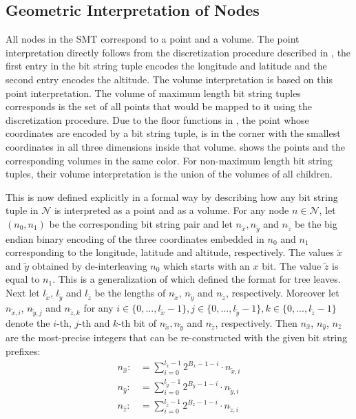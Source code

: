 \documentclass[10pt,conference,compsocconf]{IEEEtran}
\begin{document}
\subsection{Geometric Interpretation of Nodes}
\label{sec:data-structure:intermediate}
All nodes in the SMT correspond to a point and a volume.
The point interpretation directly follows from the discretization procedure described in , the first entry in the bit string tuple encodes the longitude and latitude and the second entry encodes the altitude.
The volume interpretation is based on this point interpretation.
The volume of maximum length bit string tuples corresponds is the set of all points that would be mapped to it using the discretization procedure.
Due to the floor functions in , the point whose coordinates are encoded by a bit string tuple, is in the corner with the smallest coordinates in all three dimensions inside that volume.
 shows the points and the corresponding volumes in the same color.
For non-maximum length bit string tuples, their volume interpretation is the union of the volumes of all children.

This is now defined explicitly in a formal way by describing how any bit string tuple in $\mathcal{N}$ is interpreted as a point and as a volume.
For any node $n \in \mathcal{N}$, let $(n_0, n_1)$ be the corresponding bit string pair and let $n_{\tilde{x}}, n_{\tilde{y}}$ and $n_{\tilde{z}}$ be the big endian binary encoding of the three coordinates embedded in $n_0$ and $n_1$ corresponding to the longitude, latitude and altitude, respectively.
The values $\tilde{x}$ and $\tilde{y}$ obtained by de-interleaving $n_0$ which starts with an $x$ bit.
The value $\tilde{z}$ is equal to $n_1$.
This is a generalization of  which defined the format for tree leaves.
Next let $l_{\tilde{x}}$, $l_{\tilde{y}}$ and $l_{\tilde{z}}$ be the lengths of $n_{\tilde{x}}$, $n_{\tilde{y}}$ and $n_{\tilde{z}}$, respectively.
Moreover let $n_{\tilde{x},i}$, $n_{\tilde{y},j}$ and $n_{\tilde{z},k}$ for any $i \in \{0, ..., l_{\tilde{x}}-1\}, j \in \{0, ..., l_{\tilde{y}}-1\}, k \in \{0, ..., l_{\tilde{z}}-1\}$ denote the $i$-th, $j$-th and $k$-th bit of $n_{\tilde{x}}, n_{\tilde{y}}$ and $n_{\tilde{z}}$, respectively.
Then $n_{\hat{x}}$, $n_{\hat{y}}$, $n_{\hat{z}}$ are the most-precise integers that can be re-constructed with the given bit string prefixes:
\begin{align}
	\label{eq:intermediate-geometric-point-partial-height:x}
	n_{\hat{x}} :&= \sum_{i=0}^{l_{\tilde{x}} - 1} 2^{B_{x} - 1 - i} \cdot n_{\tilde{x}, i}\\
	\label{eq:intermediate-geometric-point-partial-height:y}
	n_{\hat{y}} :&= \sum_{i=0}^{l_{\tilde{y}} - 1} 2^{B_{y} - 1 - i} \cdot n_{\tilde{y}, i}\\
	\label{eq:intermediate-geometric-point-partial-height:z}
	n_{\hat{z}} :&= \sum_{i=0}^{l_{\tilde{z}} - 1} 2^{B_{z} - 1 - i} \cdot n_{\tilde{z}, i}
\end{align}
\end{document}
